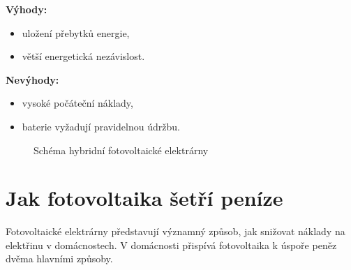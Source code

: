 \begin{multicols}{2}
    \textbf{Výhody:}
    \begin{itemize}[leftmargin=*]
        \item uložení přebytků energie,
        \item větší energetická nezávislost.
    \end{itemize}
    
    \columnbreak
    
    \textbf{Nevýhody:}
    \begin{itemize}[leftmargin=*]
        \item vysoké počáteční náklady,
        \item baterie vyžadují pravidelnou údržbu.
    \end{itemize}

\end{multicols}

\begin{figure}[h]
    \centering
    \caption{Schéma hybridní fotovoltaické elektrárny}
    \label{fig:hybrid_schema}
\end{figure}


\section{Jak fotovoltaika šetří peníze}
Fotovoltaické elektrárny představují významný způsob, jak snižovat náklady na elektřinu v domácnostech.
V domácnosti přispívá fotovoltaika k úspoře peněz dvěma hlavními způsoby.

